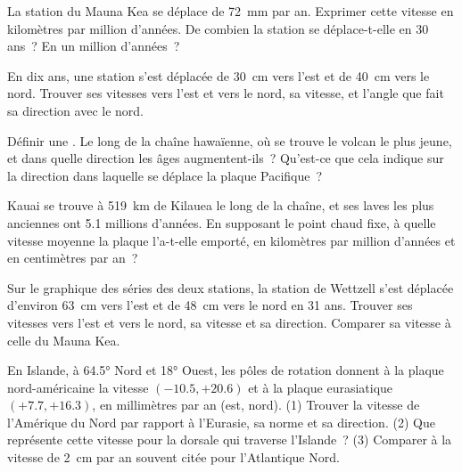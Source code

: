 \begin{exercise}[$\star$]\label{exo:g11:plate-motions:2}
La station du Mauna Kea se déplace de \qty{72}{mm} par an. Exprimer cette
vitesse en kilomètres par million d'années. De combien la station se
déplace-t-elle en 30 ans~? En un million d'années~?
\end{exercise}

\begin{exercise}[$\star$]\label{exo:g11:plate-motions:3}
En dix ans, une station s'est déplacée de \qty{30}{cm} vers l'est et de
\qty{40}{cm} vers le nord. Trouver ses vitesses vers l'est et vers le nord,
sa vitesse, et l'angle que fait sa direction avec le nord.
\end{exercise}

\begin{exercise}[$\star$]\label{exo:g11:plate-motions:4}
Définir une . Le long de la chaîne hawaïenne, où se
trouve le volcan le plus jeune, et dans quelle direction les âges
augmentent-ils~? Qu'est-ce que cela indique sur la direction dans laquelle
se déplace la plaque Pacifique~?
\end{exercise}

\begin{exercise}[$\star$]\label{exo:g11:plate-motions:5}
Kauai se trouve à \qty{519}{km} de Kilauea le long de la chaîne, et ses
laves les plus anciennes ont \num{5.1} millions d'années. En supposant le
point chaud fixe, à quelle vitesse moyenne la plaque l'a-t-elle emporté, en
kilomètres par million d'années et en centimètres par an~?
\end{exercise}

\begin{exercise}[$\star\star$]\label{exo:g11:plate-motions:6}
Sur le graphique des séries des deux stations, la station de Wettzell s'est
déplacée d'environ \qty{63}{cm} vers l'est et de \qty{48}{cm} vers le nord
en 31 ans. Trouver ses vitesses vers l'est et vers le nord, sa vitesse et sa
direction. Comparer sa vitesse à celle du Mauna Kea.
\end{exercise}

\begin{exercise}[$\star\star$]\label{exo:g11:plate-motions:7}
En Islande, à \ang{64.5} Nord et \ang{18} Ouest, les pôles de rotation
donnent à la plaque nord-américaine la vitesse $(-10.5, +20.6)$ et à la
plaque eurasiatique $(+7.7, +16.3)$, en millimètres par an (est, nord).
(1) Trouver la vitesse de l'Amérique du Nord par rapport à l'Eurasie, sa
norme et sa direction. (2) Que représente cette vitesse pour la dorsale qui
traverse l'Islande~? (3) Comparer à la vitesse de \qty{2}{cm} par an souvent
citée pour l'Atlantique Nord.
\end{exercise}

